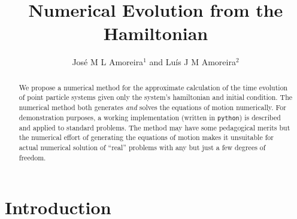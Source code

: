 \documentclass{iopart}
\begin{document}
\title{Numerical Evolution from the Hamiltonian}
\author{José M L Amoreira$^1$ and Luís J M Amoreira$^2$}
\address{$^1$ Departamento de Física, Instituto Superior Técnico, Lisboa,
Portugal}
\address{$^2$ Departamento de Física, Universidade da Beira Interior, Covilhã,
Portugal}
\begin{abstract}
  We propose a numerical method for the approximate calculation of the time
  evolution of point particle systems given only the system's hamiltonian and
  initial condition. The numerical method both generates \emph{and} solves
  the equations of motion numerically. For demonstration purposes, a working
  im\-ple\-men\-ta\-tion (written in \texttt{python}) is described and applied to
  standard problems. The method may have some pedagogical merits but the
  numerical effort of generating the equations of motion makes it unsuitable for
  actual numerical solution of ``real'' problems with any but just a few degrees
  of freedom.
\end{abstract}
\submitto{\EJP}
\maketitle
\section{Introduction}
\end{document}
